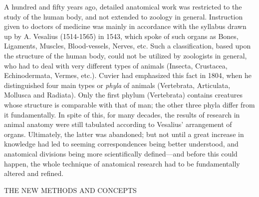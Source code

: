 A hundred and fifty years ago, detailed anatomical work was restricted to the study of the
human body, and not extended to zoology in general. Instruction given to doctors of
medicine was mainly in accordance with the syllabus drawn up by A. Vesalius (1514-1565)
in 1543, which spoke of such organs as Bones, Ligaments, Muscles, Blood-vessels, Nerves,
etc. Such a classification, based upon the structure of the human body, could not be utilized
by zoologists in general, who had to deal with very different types of animals (Insecta,
Crustacea, Echinodermata, Vermes, etc.). Cuvier had emphasized this fact in 1804, when he
distinguished four main types or \textit{phyla} of animals (Vertebrata, Articulata, Mollusca and
Radiata). Only the first phylum (Vertebrata) contains creatures whose structure is comparable
with that of man; the other three phyla differ from it fundamentally. In spite of this, for many
decades, the results of research in animal anatomy were still tabulated according to Vesalius'
arrangement of organs. Ultimately, the latter was abandoned; but not until a great increase in
knowledge had led to seeming correspondences being better understood, and anatomical
divisions being more scientifically defined—and before this could happen, the whole
technique of anatomical research had to be fundamentally altered and refined.

THE NEW METHODS AND CONCEPTS

